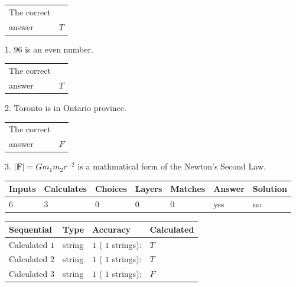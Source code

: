 \documentclass[12pt]{article}
\begin{document}
 
 
\noindent{}
 
 

 
\noindent\begin{tabular}{|l|l|}\hline The correct & \\
          answer &  %
$T$ \\ \hline \end{tabular}
1. $ %
96$ is an  %
even number.
 
\noindent\begin{tabular}{|l|l|}\hline The correct & \\
          answer &  %
$T$ \\ \hline \end{tabular}
2.  %
Toronto is in  %
Ontario province.
 
\noindent\begin{tabular}{|l|l|}\hline The correct & \\
          answer &  %
$F$ \\ \hline \end{tabular}
3.  %
$\left| \mathbf{F}\right| =Gm_1m_2r^{-2}$ is a mathmatical form of  %
the Newton's Second Law.
 
 
 
\noindent{}
 
 

 
\vspace{0.3in}
   
   
   
   
\noindent\begin{tabular}{|l|l|l|l|l|l|l|}
 \hline
Inputs & Calculates & Choices & Layers & Matches & Answer & Solution \\ \hline
           6  & 
           3  & 
           0
  & 
           0  & 
           0  & 
  yes & 
  no 
  \\ \hline
 \end{tabular}
   
   
   
   
\noindent{}
   
   
  
  
\noindent\begin{tabular}{|l|l|l|l|}
\hline
 Sequential & Type & Accuracy & Calculated \\ 
\hline
 
 
  Calculated $            1 $ & string & $            1  $ ( $           1  $ strings): 
 & $T$
 \\  \hline  
 
 
  Calculated $            2 $ & string & $            1  $ ( $           1  $ strings): 
 & $T$
 \\  \hline  
 
 
  Calculated $            3 $ & string & $            1  $ ( $           1  $ strings): 
 & $F$
 \\  \hline  
 \end{tabular}
   
\end{document}
